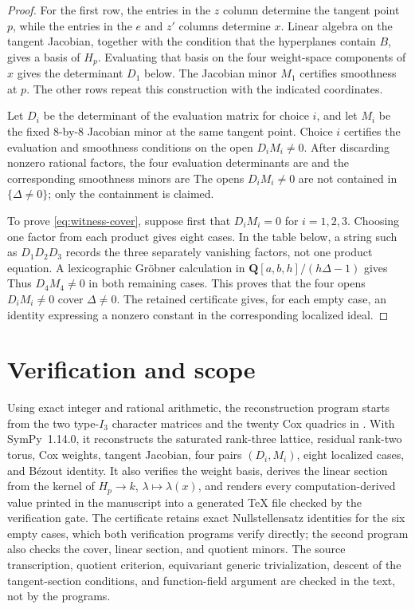 \documentclass[11pt]{article}
\theoremstyle{remark}
\begin{document}
\begin{proof}
For the first row, the entries in the \(z\) column determine the tangent
point \(p\), while the entries in the \(e\) and \(z'\) columns determine
\(x\).  Linear algebra on the tangent Jacobian, together with the condition
that the hyperplanes contain \(B\), gives a basis of \(H_p\).  Evaluating
that basis on the four weight-space components of \(x\) gives the
determinant \(D_1\) below.  The Jacobian minor \(M_1\) certifies smoothness
at \(p\).  The other rows repeat this construction with the indicated
coordinates.

Let \(D_i\) be the determinant of the evaluation matrix for choice \(i\), and
let \(M_i\) be the fixed \(8\)-by-\(8\) Jacobian minor at the same tangent
point.  Choice \(i\) certifies the evaluation and smoothness conditions on
the open \(D_iM_i\ne0\).  After discarding nonzero rational factors, the four
evaluation determinants are
\SliceDeterminants
and the corresponding smoothness minors are
\SliceMinors
The opens \(D_iM_i\ne0\) are not contained in \(\{\Delta\ne0\}\); only the
containment is claimed.

To prove \eqref{eq:witness-cover}, suppose first that
\(D_iM_i=0\) for \(i=1,2,3\).  Choosing one factor from each product gives
eight cases.  In the table below, a string such as \(D_1D_2D_3\)
records the three separately vanishing factors, not one product equation.
A lexicographic Gr\"obner calculation in
\(\mathbf Q[a,b,h]/(h\Delta-1)\) gives
\SliceCoverArithmetic
Thus \(D_4M_4\ne0\) in both remaining cases.  This proves that the four
opens \(D_iM_i\ne0\) cover \(\Delta\ne0\).  The retained certificate gives,
for each empty case, an identity expressing a nonzero constant in the
corresponding localized ideal.
\end{proof}

\section{Verification and scope}\label{sec:verification}

Using exact integer and rational arithmetic, the reconstruction program starts
from the two type-\(I_3\) character matrices and the twenty Cox quadrics in
\cite[Section~3]{TZ}.  With SymPy~1.14.0, it reconstructs the saturated
rank-three lattice, residual rank-two torus, Cox weights, tangent Jacobian,
four pairs \((D_i,M_i)\), eight localized cases, and B\'ezout identity.  It
also verifies the weight basis, derives the linear section from the kernel of
\(H_p\to k\), \(\lambda\mapsto\lambda(x)\), and renders every
computation-derived value printed in the manuscript into a generated TeX
file checked by the verification gate.  The certificate retains exact
Nullstellensatz identities for the six empty cases, which both verification
programs verify directly; the second
program also checks the cover, linear section, and quotient minors.  The
source transcription, quotient criterion, equivariant generic
trivialization, descent of the tangent-section conditions, and function-field
argument are checked in the text, not by the programs.
\end{document}
